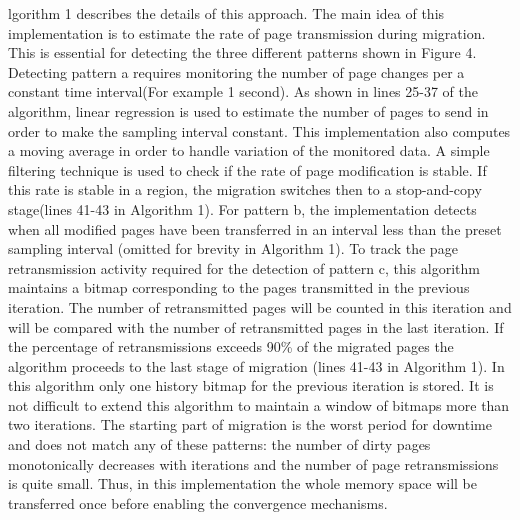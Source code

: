 \documentclass[runningheads]{llncs}
\begin{document}
lgorithm 1 describes the details of this approach. The main idea of this implementation is to estimate the rate of page transmission during migration. This is essential for detecting the three different patterns shown in Figure 4. Detecting pattern a requires monitoring the number of page changes per a constant time interval(For example 1 second). As shown in lines 25-37 of the algorithm, linear regression is used to estimate the number of pages to send in order to make the sampling interval constant. This implementation also computes a moving average in order to handle variation of the monitored data. A simple filtering technique is used to check if the rate of page modification is stable. If this rate is stable in a region, the migration switches then to a stop-and-copy stage(lines 41-43 in Algorithm 1). For pattern b, the implementation detects when all modified pages have been transferred in an interval less than the preset sampling interval (omitted for brevity in Algorithm 1). To track the page retransmission activity required for the detection of pattern c, this algorithm maintains a bitmap corresponding to the pages transmitted in the previous iteration. The number of retransmitted pages will be counted in this iteration and will be compared with the number of retransmitted pages in the last iteration. If the percentage of retransmissions exceeds 90\% of the migrated pages the algorithm proceeds to the last stage of migration (lines 41-43 in Algorithm 1). In this algorithm only one history bitmap for the previous iteration is stored. It is not difficult to extend this algorithm to maintain a window of bitmaps more than two iterations. The starting part of migration is the worst period for downtime and does not match any of these patterns: the number of dirty pages monotonically decreases with iterations and the number of page retransmissions is quite small. Thus, in this implementation the whole memory space will be transferred once before enabling the convergence mechanisms\cite{ibrahim2011optimized}.
\end{document}
